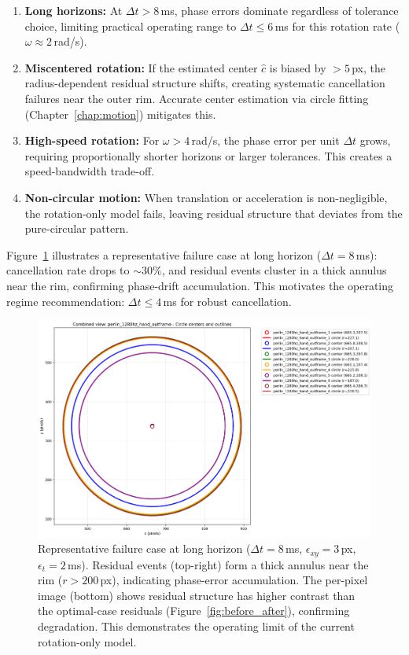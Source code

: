 \begin{enumerate}
\item \textbf{Long horizons:} At $\Delta t > 8$\,ms, phase errors dominate regardless of tolerance choice, limiting practical operating range to $\Delta t \leq 6$\,ms for this rotation rate ($\omega \approx 2$\,rad/s).
\item \textbf{Miscentered rotation:} If the estimated center $\hat c$ is biased by $> 5$\,px, the radius-dependent residual structure shifts, creating systematic cancellation failures near the outer rim. Accurate center estimation via circle fitting (Chapter~\ref{chap:motion}) mitigates this.
\item \textbf{High-speed rotation:} For $\omega > 4$\,rad/s, the phase error per unit $\Delta t$ grows, requiring proportionally shorter horizons or larger tolerances. This creates a speed-bandwidth trade-off.
\item \textbf{Non-circular motion:} When translation or acceleration is non-negligible, the rotation-only model fails, leaving residual structure that deviates from the pure-circular pattern.
\end{enumerate}

Figure~\ref{fig:failure_case} illustrates a representative failure case at long horizon ($\Delta t=8$\,ms): cancellation rate drops to $\sim 30\%$, and residual events cluster in a thick annulus near the rim, confirming phase-drift accumulation. This motivates the operating regime recommendation: $\Delta t \leq 4$\,ms for robust cancellation.

\begin{figure}[t]
  \centering
  \includegraphics[width=0.75\linewidth]{../code/pipeline/results_plots/perlin_1280hz_hand_outframe_combined_circles.png}
  \caption{Representative failure case at long horizon ($\Delta t=8$\,ms, $\epsilon_{xy}=3$\,px, $\epsilon_t=2$\,ms). Residual events (top-right) form a thick annulus near the rim ($r > 200$\,px), indicating phase-error accumulation. The per-pixel image (bottom) shows residual structure has higher contrast than the optimal-case residuals (Figure~\ref{fig:before_after}), confirming degradation. This demonstrates the operating limit of the current rotation-only model.}
  \label{fig:failure_case}
\end{figure}

